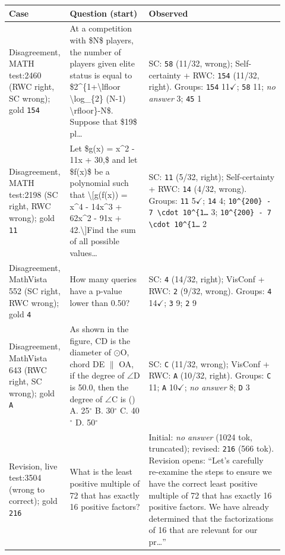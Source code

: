 \begin{tabular}{@{}>{\raggedright\arraybackslash}p{0.16\linewidth}>{\raggedright\arraybackslash}p{0.28\linewidth}>{\raggedright\arraybackslash}p{0.48\linewidth}@{}}
\toprule
Case & Question (start) & Observed \\
\midrule
Disagreement, MATH test:2460 (RWC right, SC wrong); gold \texttt{154} & At a competition with \$N\$ players, the number of players given elite status is equal to \$2\textasciicircum{}\{1+\textbackslash{}lfloor \textbackslash{}log\_\{2\} (N-1) \textbackslash{}rfloor\}-N\$. Suppose that \$19\$ pl\ldots & SC: \texttt{58} (11/32, wrong); Self-certainty + RWC: \texttt{154} (11/32, right). Groups: \texttt{154} 11$\checkmark$; \texttt{58} 11; \textit{no answer} 3; \texttt{45} 1 \\
Disagreement, MATH test:2198 (SC right, RWC wrong); gold \texttt{11} & Let \$g(x) = x\textasciicircum{}2 - 11x + 30,\$ and let \$f(x)\$ be a polynomial such that \textbackslash{}[g(f(x)) = x\textasciicircum{}4 - 14x\textasciicircum{}3 + 62x\textasciicircum{}2 - 91x + 42.\textbackslash{}]Find the sum of all possible values\ldots & SC: \texttt{11} (5/32, right); Self-certainty + RWC: \texttt{14} (4/32, wrong). Groups: \texttt{11} 5$\checkmark$; \texttt{14} 4; \texttt{10\textasciicircum{}\{200\} - 7 \textbackslash{}cdot 10\textasciicircum{}\{1\ldots} 3; \texttt{10\textasciicircum{}\{200\} - 7 \textbackslash{}cdot 10\textasciicircum{}\{1\ldots} 2 \\
Disagreement, MathVista 552 (SC right, RWC wrong); gold \texttt{4} & How many queries have a p-value lower than 0.50? & SC: \texttt{4} (14/32, right); VisConf + RWC: \texttt{2} (9/32, wrong). Groups: \texttt{4} 14$\checkmark$; \texttt{3} 9; \texttt{2} 9 \\
Disagreement, MathVista 643 (RWC right, SC wrong); gold \texttt{A} & As shown in the figure, CD is the diameter of $\odot$O, chord DE $\parallel$ OA, if the degree of $\angle$D is 50.0, then the degree of $\angle$C is () A. 25$^\circ$ B. 30$^\circ$ C. 40$^\circ$ D. 50$^\circ$ & SC: \texttt{C} (11/32, wrong); VisConf + RWC: \texttt{A} (10/32, right). Groups: \texttt{C} 11; \texttt{A} 10$\checkmark$; \textit{no answer} 8; \texttt{D} 3 \\ \midrule
Revision, live test:3504 (wrong to correct); gold \texttt{216} & What is the least positive multiple of 72 that has exactly 16 positive factors? & Initial: \textit{no answer} (1024 tok, truncated); revised: \texttt{216} (566 tok). Revision opens: ``Let's carefully re-examine the steps to ensure we have the correct least positive multiple of 72 that has exactly 16 positive factors. We have already determined that the factorizations of 16 that are relevant for our pr\ldots'' \\

\end{tabular}
